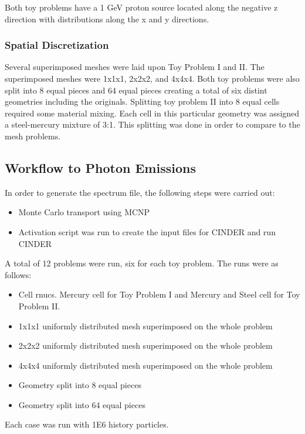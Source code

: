 Both toy problems have a 1 GeV proton source located 
along the negative z direction with distributions along the x and y directions.

\subsubsection{Spatial Discretization}
Several superimposed meshes were laid upon Toy Problem I and II. 
The superimposed meshes were 1x1x1, 2x2x2, and 4x4x4. Both toy problems
were also split into 8 equal pieces and 64 equal pieces creating a total of
six distint geometries including the originals. 
Splitting toy problem II into 8 equal cells required some material mixing. 
Each cell in this particular geometry was assigned a steel-mercury mixture
of 3:1. 
This splitting was done in order to compare to the mesh problems. 

\subsection{Workflow to Photon Emissions}
In order to generate the spectrum file, the following steps were carried out:
\begin{itemize}
\item Monte Carlo transport using MCNP 
\item Activation script was run to create the input files for CINDER and  run CINDER
\end{itemize}
A total of 12 problems were run, six for each toy problem. The runs were as follows:
\begin{itemize}
\item Cell rnucs. Mercury cell for Toy Problem I and Mercury and Steel cell for 
Toy Problem II.
\item 1x1x1 uniformly distributed mesh superimposed on the whole problem
\item 2x2x2 uniformly distributed mesh superimposed on the whole problem
\item 4x4x4 uniformly distributed mesh superimposed on the whole problem
\item Geometry split into 8 equal pieces
\item Geometry split into 64 equal pieces
\end{itemize}
Each case was run with 1E6 history particles. 

\newpage
